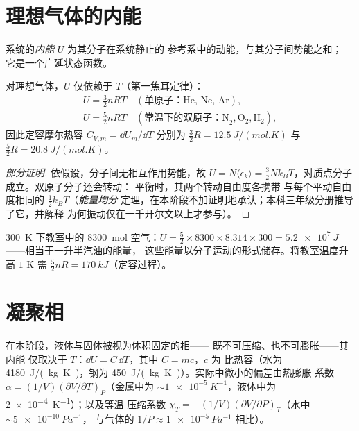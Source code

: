 \section{理想气体的内能}

\begin{definition}[内能]\label{def:b1:kinetic-theory:U}
系统的\emph{内能} $U$ 为其分子在系统静止的
参考系中的动能，与其分子间势能之和；
它是一个广延状态函数。
\end{definition}

\begin{proposition}[理想气体的内能]\label{prop:b1:kinetic-theory:Ugas}
对理想气体，$U$ 仅依赖于 $T$（第一焦耳定律）：
\begin{gather*}
U = \tfrac32 nRT \quad (\text{单原子：He, Ne, Ar}), \\
U = \tfrac52 nRT \quad (\text{常温下的双原子：N}_2, \text{O}_2, \text{H}_2),
\end{gather*}
因此定容摩尔热容 $C_{V,m} = \dd U_m/\dd T$
分别为 $\tfrac32 R = \qty{12.5}{J/(mol.K)}$ 与
$\tfrac52 R = \qty{20.8}{J/(mol.K)}$。
\end{proposition}

\begin{proof}[部分证明]
依假设，分子间无相互作用势能，故 $U = N\langle\epsilon_k\rangle
= \tfrac32 Nk_BT$，对质点分子成立。双原子分子还会转动：
平衡时，其两个转动自由度各携带
与每个平动自由度相同的 $\tfrac12 k_BT$（\emph{能量均分}
定理，在本阶段不加证明地承认；本科三年级分册推导了它，并解释
为何振动仅在一千开尔文以上才参与）。
\end{proof}

\begin{example}[一间教室的能量]\label{ex:b1:kinetic-theory:room}
\qty{300}{K} 下教室中的 \qty{8300}{mol} 空气：$U = \tfrac52 \times
8300 \times 8.314 \times 300 = \qty{5.2e7}{J}$——相当于一升半汽油的能量，
这些能量以分子运动的形式储存。将教室温度升高 $1$ K
需 $\tfrac52 nR = \qty{170}{kJ}$（定容过程）。
\end{example}

\section{凝聚相}

\begin{proposition}\label{prop:b1:kinetic-theory:condensed}
在本阶段，液体与固体被视为体积固定的相——
既不可压缩、也不可膨胀——其内能
仅取决于 $T$：$\dd U = C\,\dd T$，其中 $C = mc$，$c$ 为
比热容（水为 \qty{4180}{J/(kg.K)}，钢为
\qty{450}{J/(kg.K)}）。实际中微小的偏差由热膨胀
系数 $\alpha = (1/V)(\partial V/\partial T)_P$（金属中为
$\sim\qty{1e-5}{K^{-1}}$，液体中为 \qty{2e-4}{K^{-1}}）；以及等温
压缩系数 $\chi_T = -(1/V)(\partial V/\partial P)_T$（水中 $\sim\qty{5e-10}{Pa^{-1}}$，
与气体的 $1/P \approx \qty{1e-5}{Pa^{-1}}$ 相比）。
\end{proposition}
\admitted

